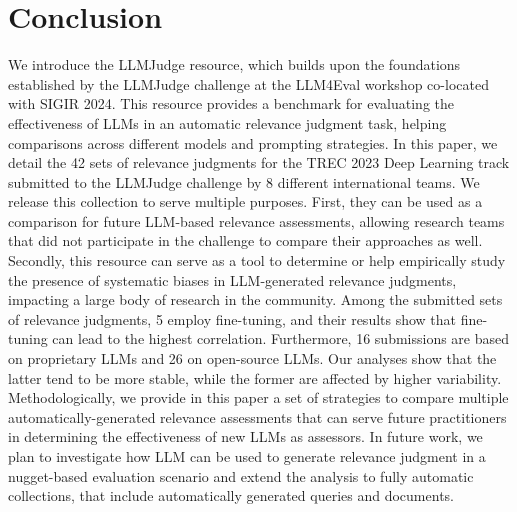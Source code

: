 \section{Conclusion}
\label{sec:conclusion}
We introduce the LLMJudge resource, which builds upon the foundations established by the LLMJudge challenge \cite{rahmani2024llmjudge} at the LLM4Eval workshop \cite{rahmani2024llm4eval,rahmani2024report} co-located with SIGIR 2024. This resource provides a benchmark for evaluating the effectiveness of LLMs in an automatic relevance judgment task, helping comparisons across different models and prompting strategies.
In this paper, we detail the 42 sets of relevance judgments for the TREC 2023 Deep Learning track submitted to the LLMJudge challenge by 8 different international teams. 
We release this collection to serve multiple purposes. First, they can be used as a comparison for future LLM-based relevance assessments, allowing research teams that did not participate in the challenge to compare their approaches as well. Secondly, this resource can serve as a tool to determine or help empirically study the presence of systematic biases in LLM-generated relevance judgments, impacting a large body of research in the community.
Among the submitted sets of relevance judgments, 5 employ fine-tuning, and their results show that fine-tuning can lead to the highest correlation. Furthermore, 16 submissions are based on proprietary LLMs and 26 on open-source LLMs. Our analyses show that the latter tend to be more stable, while the former are affected by higher variability.
Methodologically, we provide in this paper a set of strategies to compare multiple automatically-generated relevance assessments that can serve future practitioners in determining the effectiveness of new LLMs as assessors.
In future work, we plan to investigate how LLM can be used to generate relevance judgment in a nugget-based evaluation scenario and extend the analysis to fully automatic collections, that include automatically generated queries and documents.